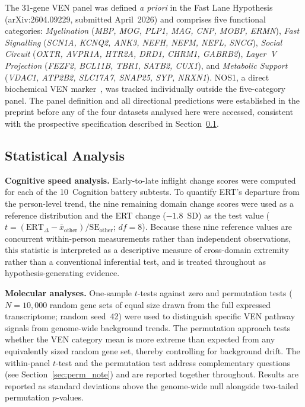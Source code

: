 \documentclass[11pt]{article}
\begin{document}
The 31-gene VEN panel was defined \textit{a priori} in the Fast Lane
Hypothesis~\cite{keskin2026} (arXiv:2604.09229, submitted April~2026) and
comprises five functional categories:
\textit{Myelination} (\textit{MBP, MOG, PLP1, MAG, CNP, MOBP, ERMN}),
\textit{Fast Signalling} (\textit{SCN1A, KCNQ2, ANK3, NEFH, NEFM, NEFL,
SNCG}), \textit{Social Circuit} (\textit{OXTR, AVPR1A, HTR2A, DRD1,
CHRM1, GABRB2}), \textit{Layer~V Projection} (\textit{FEZF2, BCL11B,
TBR1, SATB2, CUX1}), and \textit{Metabolic Support} (\textit{VDAC1,
ATP2B2, SLC17A7, SNAP25, SYP, NRXN1}).
NOS1, a direct biochemical VEN marker~\cite{stimpson2011}, was tracked
individually outside the five-category panel.
The panel definition and all directional predictions were established in the
preprint before any of the four datasets analysed here were accessed,
consistent with the prospective specification described in
Section~\ref{sec:stats}.

\subsection{Statistical Analysis}
\label{sec:stats}

\textbf{Cognitive speed analysis.}
Early-to-late inflight change scores were computed for each of the
10~Cognition battery subtests.
To quantify ERT's departure from the person-level trend, the nine remaining
domain change scores were used as a reference distribution and the ERT
change ($-1.8$~SD) as the test value
($t = (\text{ERT}_{\Delta} - \bar{x}_{\text{other}}) /
\text{SE}_{\text{other}}$; $df=8$).
Because these nine reference values are concurrent within-person
measurements rather than independent observations, this statistic is
interpreted as a descriptive measure of cross-domain extremity rather than
a conventional inferential test, and is treated throughout as
hypothesis-generating evidence.

\textbf{Molecular analyses.}
One-sample $t$-tests against zero and permutation tests ($N=10{,}000$
random gene sets of equal size drawn from the full expressed transcriptome;
random seed~42) were used to distinguish specific VEN pathway signals from
genome-wide background trends.
The permutation approach tests whether the VEN category mean is more
extreme than expected from any equivalently sized random gene set, thereby
controlling for background drift.
The within-panel $t$-test and the permutation test address complementary
questions (see Section~\ref{sec:perm_note}) and are reported together
throughout.
Results are reported as standard deviations above the genome-wide null
alongside two-tailed permutation $p$-values.
\end{document}
